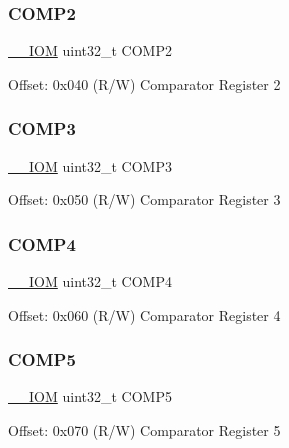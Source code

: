 \subsubsection{\texorpdfstring{C\+O\+M\+P2}{COMP2}}
{\footnotesize\ttfamily \mbox{\hyperlink{core__cm4_8h_ab6caba5853a60a17e8e04499b52bf691}{\+\_\+\+\_\+\+I\+OM}} uint32\+\_\+t C\+O\+M\+P2}

Offset\+: 0x040 (R/W) Comparator Register 2 \mbox{\label{struct_d_w_t___type_a20b0b62a3576ee88db4a7c065cd988ac}} 
\subsubsection{\texorpdfstring{C\+O\+M\+P3}{COMP3}}
{\footnotesize\ttfamily \mbox{\hyperlink{core__cm4_8h_ab6caba5853a60a17e8e04499b52bf691}{\+\_\+\+\_\+\+I\+OM}} uint32\+\_\+t C\+O\+M\+P3}

Offset\+: 0x050 (R/W) Comparator Register 3 \mbox{\label{struct_d_w_t___type_a8ea52ce87f7d0225db1b5ba91313f4b7}} 
\subsubsection{\texorpdfstring{C\+O\+M\+P4}{COMP4}}
{\footnotesize\ttfamily \mbox{\hyperlink{core__cm4_8h_ab6caba5853a60a17e8e04499b52bf691}{\+\_\+\+\_\+\+I\+OM}} uint32\+\_\+t C\+O\+M\+P4}

Offset\+: 0x060 (R/W) Comparator Register 4 \mbox{\label{struct_d_w_t___type_a290e024c0b0f35317de6363a4135c3bc}} 
\subsubsection{\texorpdfstring{C\+O\+M\+P5}{COMP5}}
{\footnotesize\ttfamily \mbox{\hyperlink{core__cm4_8h_ab6caba5853a60a17e8e04499b52bf691}{\+\_\+\+\_\+\+I\+OM}} uint32\+\_\+t C\+O\+M\+P5}

Offset\+: 0x070 (R/W) Comparator Register 5 \mbox{\label{struct_d_w_t___type_a263131067f0ad2d04a2711962a455bfa}} 
